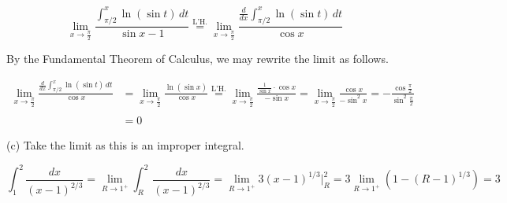 \documentclass{article}
\begin{document}
\[\lim_{x\to\textstyle\frac\pi2}\frac{\displaystyle\int_{\pi/2}^x\ln(\sin t)\,dt}{\sin x-1}\overset{\text{L'H.}}{=}\lim_{x\to\textstyle\frac\pi2}\frac{\displaystyle\frac d{dx}\int_{\pi/2}^x\ln(\sin t)\,dt}{\cos x}\]

\hfill

\noindent By the Fundamental Theorem of Calculus, we may rewrite the limit as follows.

\begin{align*}\lim_{x\to\textstyle\frac\pi2}\frac{\displaystyle\frac d{dx}\int_{\pi/2}^x\ln(\sin t)\,dt}{\cos x}&=\lim_{x\to\textstyle\frac\pi2}\frac{\ln(\sin x)}{\cos x}\overset{\text{L'H.}}{=}\lim_{x\to\textstyle\frac\pi2}\frac{\frac1{\sin x}\cdot\cos x}{-\sin x}=\lim_{x\to\textstyle\frac\pi2}\frac{\cos x}{-\sin^2x}=-\frac{\cos\frac\pi2}{\sin^2\frac\pi2}\\\\&=\boxed0\end{align*}

\hfill

\noindent (c) Take the limit as this is an improper integral.

\[\int_1^2\frac{dx}{(x-1)^{2/3}}=\lim_{R\to1^+}\int_R^2\frac{dx}{(x-1)^{2/3}}=\lim_{R\to1^+}3(x-1)^{1/3}\bigg|_R^2=3\lim_{R\to1^+}\left(1-(R-1)^{1/3}\right)=\boxed3\]

\newpage
\end{document}
